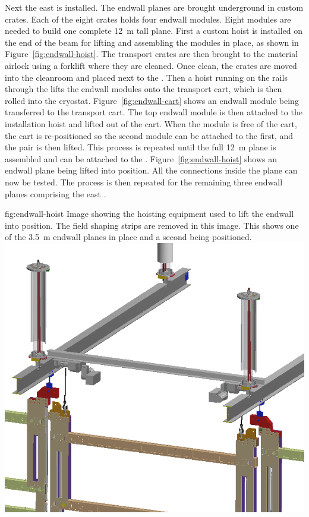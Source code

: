 Next the east  is installed. The endwall planes are brought underground in custom crates. Each of the eight crates holds four endwall modules.  Eight modules are needed to build one complete \SI{12}{m} tall plane.  First a custom hoist is installed on the end of the  beam for lifting and assembling the modules in place, as shown in Figure~\ref{fig:endwall-hoist}. The  transport crates are then brought to the material airlock using a forklift where they are cleaned.  Once clean, the crates are moved into the cleanroom and placed next to the . Then a hoist running on the rails through the  lifts the endwall modules onto the transport cart, which is then rolled into the cryostat. Figure~\ref{fig:endwall-cart} shows an endwall module being transferred to the transport cart. The top endwall module is then attached to the installation hoist and lifted out of the cart. When the module is free of  the cart, the cart is re-positioned so the second module can be attached to the first, and the pair is then lifted. This process is repeated until the full \SI{12}{m}  plane is assembled and can be attached to the . 
Figure~\ref{fig:endwall-hoist} shows an endwall plane being lifted into position.
All the  connections inside the plane can now be tested. The process is then repeated for the remaining three endwall planes comprising the east  . 
 
 \begin{dunefigure}{fig:endwall-hoist}
  {Image showing the hoisting equipment used to lift the endwall into position. The field shaping strips are removed in this image. This shows one of the \SI{3.5}{\meter} endwall planes in place and a second being positioned. }
\includegraphics[width=.5\textwidth]{graphics/endwall-hoist.png}
\end{dunefigure}
 

